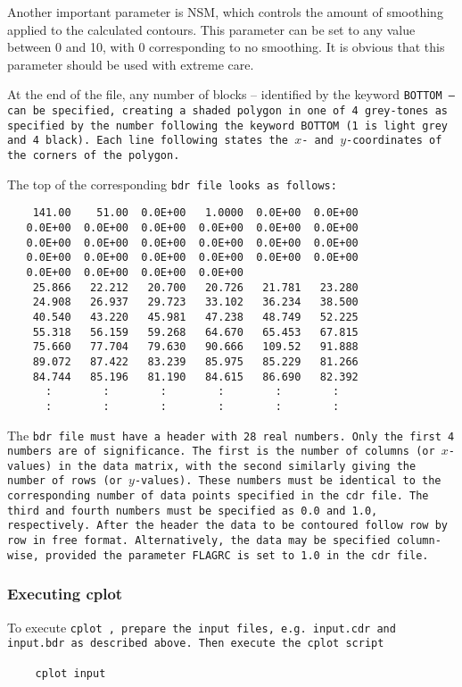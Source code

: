 Another important parameter is NSM, which controls the amount of smoothing
applied to the calculated contours. This parameter can be set to any value 
between 0 and 10, with 0 corresponding to no smoothing. It is obvious that this
parameter should be used with extreme care.

At the end of the file, any number of blocks -- identified by the
keyword \tt BOTTOM \rm -- can be specified, creating a shaded polygon
in one of 4 grey-tones as specified by the number
following the keyword \tt BOTTOM \rm (1 is light grey and 4 black). 
Each line following states the
$x$- and $y$-coordinates of the corners of the polygon.

The top of the corresponding \tt bdr \rm file looks as follows:

\small
\begin{verbatim}
    141.00    51.00  0.0E+00   1.0000  0.0E+00  0.0E+00
   0.0E+00  0.0E+00  0.0E+00  0.0E+00  0.0E+00  0.0E+00
   0.0E+00  0.0E+00  0.0E+00  0.0E+00  0.0E+00  0.0E+00
   0.0E+00  0.0E+00  0.0E+00  0.0E+00  0.0E+00  0.0E+00
   0.0E+00  0.0E+00  0.0E+00  0.0E+00  
    25.866   22.212   20.700   20.726   21.781   23.280    
    24.908   26.937   29.723   33.102   36.234   38.500    
    40.540   43.220   45.981   47.238   48.749   52.225    
    55.318   56.159   59.268   64.670   65.453   67.815    
    75.660   77.704   79.630   90.666   109.52   91.888    
    89.072   87.422   83.239   85.975   85.229   81.266    
    84.744   85.196   81.190   84.615   86.690   82.392    
      :        :        :        :        :        :
      :        :        :        :        :        :
\end{verbatim}
\normalsize

The \tt bdr \rm file must have a header with 28 real numbers. Only the
first 4 numbers are of significance. The first is the number of
columns
(or $x$-values) in the data matrix, with the second similarly giving
the
number of rows (or $y$-values). These numbers must be identical to the
corresponding number of data points specified in the \tt cdr \rm file.
The third and fourth numbers must be specified as 0.0 and 1.0, 
respectively.
After the header the data to be contoured follow row by row in free
format. Alternatively, the data may be specified column-wise, 
provided the parameter FLAGRC is set to 1.0 in the \tt cdr \rm file. 


\subsubsection{Executing cplot}

To execute \tt cplot \rm, prepare the input files,
e.g. \tt input.cdr \rm  and \tt input.bdr \rm   as described above. 
Then execute the \tt cplot \rm script
\begin{itemize}
\item[$\>$] \tt cplot input \rm
\end{itemize}
